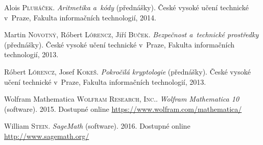 \documentclass[thesis=M,czech,hidelinks]{FITthesis}[2012/06/26]
\newcommand{\0}{{\textcolor[gray]{0.75}{0}}}
\begin{document}
\begin{thebibliography}{99}

        Alois \textsc{Pluháček}. \emph{Aritmetika a~kódy} (přednášky).
        České vysoké učení technické v~Praze, Fakulta informačních technologií,
        2014.

        Martin \textsc{Novotný}, Róbert \textsc{Lórencz}, Jiří \textsc{Buček}.
        \emph{Bezpečnost a~technické prostředky} (přednášky).
        České vysoké učení technické v~Praze, Fakulta informačních technologií,
        2013.

        Róbert \textsc{Lórencz}, Josef \textsc{Kokeš}. \emph{Pokročilá
        kryptologie} (přednášky).
        České vysoké učení technické v~Praze, Fakulta informačních technologií,
        2013.


     Wolfram Mathematica
        \textsc{Wolfram Research, Inc.}. \emph{Wolfram Mathematica 10}
        (software). 2015. Dostupné online
        \url{https://www.wolfram.com/mathematica/}

        William \textsc{Stein}. \emph{SageMath} (software). 2016. Dostupné
        online \url{http://www.sagemath.org/}

\end{thebibliography}

\appendix

\end{document}
